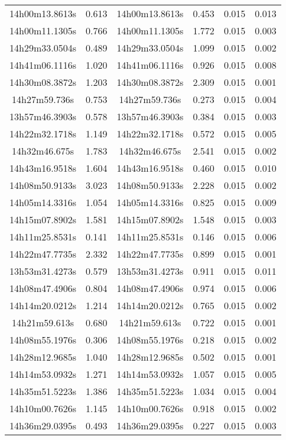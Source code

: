 \begin{table}
\begin{tabular}{cccccc}
14h00m13.8613s & 0.613 & 14h00m13.8613s & 0.453 & 0.015 & 0.013 \\
14h00m11.1305s & 0.766 & 14h00m11.1305s & 1.772 & 0.015 & 0.003 \\
14h29m33.0504s & 0.489 & 14h29m33.0504s & 1.099 & 0.015 & 0.002 \\
14h41m06.1116s & 1.020 & 14h41m06.1116s & 0.926 & 0.015 & 0.008 \\
14h30m08.3872s & 1.203 & 14h30m08.3872s & 2.309 & 0.015 & 0.001 \\
14h27m59.736s & 0.753 & 14h27m59.736s & 0.273 & 0.015 & 0.004 \\
13h57m46.3903s & 0.578 & 13h57m46.3903s & 0.384 & 0.015 & 0.003 \\
14h22m32.1718s & 1.149 & 14h22m32.1718s & 0.572 & 0.015 & 0.005 \\
14h32m46.675s & 1.783 & 14h32m46.675s & 2.541 & 0.015 & 0.002 \\
14h43m16.9518s & 1.604 & 14h43m16.9518s & 0.460 & 0.015 & 0.010 \\
14h08m50.9133s & 3.023 & 14h08m50.9133s & 2.228 & 0.015 & 0.002 \\
14h05m14.3316s & 1.054 & 14h05m14.3316s & 0.825 & 0.015 & 0.009 \\
14h15m07.8902s & 1.581 & 14h15m07.8902s & 1.548 & 0.015 & 0.003 \\
14h11m25.8531s & 0.141 & 14h11m25.8531s & 0.146 & 0.015 & 0.006 \\
14h22m47.7735s & 2.332 & 14h22m47.7735s & 0.899 & 0.015 & 0.001 \\
13h53m31.4273s & 0.579 & 13h53m31.4273s & 0.911 & 0.015 & 0.011 \\
14h08m47.4906s & 0.804 & 14h08m47.4906s & 0.974 & 0.015 & 0.006 \\
14h14m20.0212s & 1.214 & 14h14m20.0212s & 0.765 & 0.015 & 0.002 \\
14h21m59.613s & 0.680 & 14h21m59.613s & 0.722 & 0.015 & 0.001 \\
14h08m55.1976s & 0.306 & 14h08m55.1976s & 0.218 & 0.015 & 0.002 \\
14h28m12.9685s & 1.040 & 14h28m12.9685s & 0.502 & 0.015 & 0.001 \\
14h14m53.0932s & 1.271 & 14h14m53.0932s & 1.057 & 0.015 & 0.005 \\
14h35m51.5223s & 1.386 & 14h35m51.5223s & 1.034 & 0.015 & 0.004 \\
14h10m00.7626s & 1.145 & 14h10m00.7626s & 0.918 & 0.015 & 0.002 \\
14h36m29.0395s & 0.493 & 14h36m29.0395s & 0.227 & 0.015 & 0.003 \\

\end{tabular}
\end{table}
